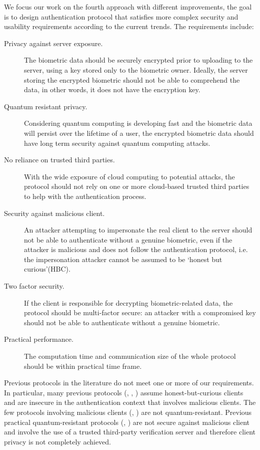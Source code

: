   We focus our work on the fourth approach with different improvements, the goal
  is to design authentication protocol that satisfies more complex security and
  usability requirements according to the current trends. The requirements include:
\begin{description}
\item [Privacy against server exposure.] The biometric data should be securely
  encrypted prior to uploading to the server, using a key stored only to the
  biometric owner. Ideally, the server storing the encrypted biometric should
  not be able to comprehend the data, in other words, it does not have the
  encryption key.

\item [Quantum resistant privacy. ] Considering quantum computing is developing
  fast and the biometric data will persist over the lifetime of a user, the
  encrypted biometric data should have long term security against quantum
  computing attacks.
\item [No reliance on trusted third parties. ] With the wide exposure of cloud
  computing to potential attacks, the protocol should not rely on one or more
  cloud-based trusted third parties to help with the authentication process.
\item [Security against malicious client.] An attacker attempting to impersonate
  the real client to the server should not be able to authenticate without a
  genuine biometric, even if the attacker is malicious and does not follow the
  authentication protocol, i.e. the impersonation attacker cannot be assumed to
  be `honest but curious'(HBC).
\item [Two factor security.] If the client is responsible for decrypting
  biometric-related data, the protocol should be multi-factor secure: an
  attacker with a compromised key should not be able to authenticate without a
  genuine biometric.
\item [Practical performance.] The computation time and communication size of
  the whole protocol should be within practical time frame.
\end{description}
Previous protocols in the literature do not meet one or more of our
requirements. In particular, many previous protocols
(\cite{bringer2007application}, \cite{erkin2009privacy},
\cite{osadchy2010scifi}) assume honest-but-curious clients and are insecure in
the authentication context that involves malicious clients. The few protocols
involving malicious clients (\cite{shahandashti2012private},
\cite{vsedvenka2015secure}) are not quantum-resistant. Previous practical
quantum-resistant protocols (\cite{yasuda2014practical},
\cite{mandal2015comprehensive}) are not secure against malicious client and
involve the use of a trusted third-party verification server and therefore
client privacy is not completely achieved.

